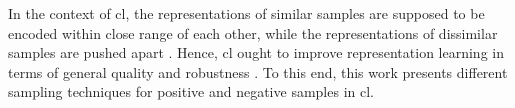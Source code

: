 In the context of \acf{cl}, 
the representations of similar samples are supposed to be encoded 
within close range of each other, 
while the representations of dissimilar samples are pushed apart \citet{mining_potential_2024}.
Hence, \ac{cl} ought to improve representation learning in terms of 
general quality and robustness \citet{mochi_2020}.
To this end, this work presents different sampling techniques for 
positive and negative samples in \ac{cl}.